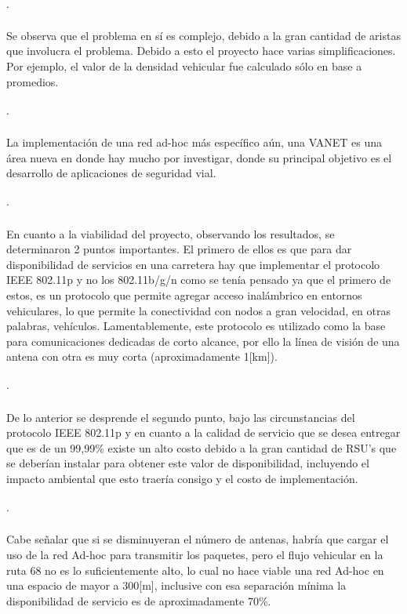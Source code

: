\documentclass[12pt]{article}
\begin{document}
\paragraph{$\cdot$}Se observa que el problema en sí es complejo, debido a la gran cantidad de aristas que 
involucra el problema. Debido a esto el proyecto hace varias simplificaciones. Por ejemplo, el valor de 
la densidad vehicular fue calculado sólo en base a promedios.
\paragraph{$\cdot$}La implementación de una red ad-hoc más específico aún, una VANET es una área nueva 
en donde hay mucho por investigar, donde su principal objetivo es el desarrollo de aplicaciones de 
seguridad vial.
\paragraph{$\cdot$}En cuanto a la viabilidad del proyecto, observando los resultados, se determinaron 
2 puntos importantes. El primero de ellos es que para dar disponibilidad de servicios en una carretera 
hay que implementar el protocolo IEEE 802.11p y no los 802.11b/g/n  como se tenía pensado ya que el 
primero de estos, es un protocolo que permite agregar acceso inalámbrico en entornos vehiculares, 
lo que permite la conectividad con nodos a gran velocidad, en otras palabras, vehículos. Lamentablemente, 
este protocolo es utilizado como la base para comunicaciones dedicadas de corto alcance, por ello la línea 
de visión de una antena con otra es muy corta (aproximadamente 1[km]).
\paragraph{$\cdot$}De lo anterior se desprende el segundo punto, bajo las circunstancias del protocolo 
IEEE 802.11p y en cuanto a la calidad de servicio que se desea entregar que es de un 99,99\% existe un 
alto costo debido a la gran cantidad de RSU’s que se deberían instalar para obtener este valor de 
disponibilidad, incluyendo el impacto ambiental que esto traería consigo y el costo de implementación.
\paragraph{$\cdot$}Cabe señalar que si se disminuyeran el número de antenas, habría que cargar el uso 
de la red Ad-hoc para transmitir los paquetes, pero el flujo vehicular en la ruta 68 no es lo 
suficientemente alto, lo cual no hace viable una red Ad-hoc en una espacio de mayor a 300[m], 
inclusive con esa separación mínima la disponibilidad de servicio es de aproximadamente 70\%.
\end{document}

